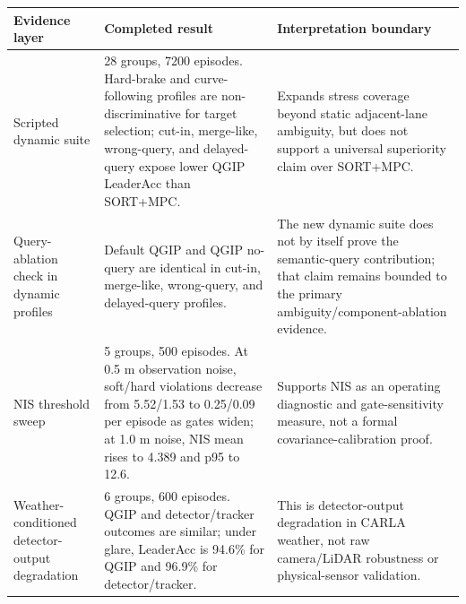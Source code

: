 \begin{tabular}{p{} p{} p{}}
\toprule
\textbf{Evidence layer} & \textbf{Completed result} & \textbf{Interpretation boundary} \\
\midrule
Scripted dynamic suite & 28 groups, 7200 episodes. Hard-brake and curve-following profiles are non-discriminative for target selection; cut-in, merge-like, wrong-query, and delayed-query expose lower QGIP LeaderAcc than SORT+MPC. & Expands stress coverage beyond static adjacent-lane ambiguity, but does not support a universal superiority claim over SORT+MPC. \\
Query-ablation check in dynamic profiles & Default QGIP and QGIP no-query are identical in cut-in, merge-like, wrong-query, and delayed-query profiles. & The new dynamic suite does not by itself prove the semantic-query contribution; that claim remains bounded to the primary ambiguity/component-ablation evidence. \\
NIS threshold sweep & 5 groups, 500 episodes. At 0.5 m observation noise, soft/hard violations decrease from 5.52/1.53 to 0.25/0.09 per episode as gates widen; at 1.0 m noise, NIS mean rises to 4.389 and p95 to 12.6. & Supports NIS as an operating diagnostic and gate-sensitivity measure, not a formal covariance-calibration proof. \\
Weather-conditioned detector-output degradation & 6 groups, 600 episodes. QGIP and detector/tracker outcomes are similar; under glare, LeaderAcc is 94.6\% for QGIP and 96.9\% for detector/tracker. & This is detector-output degradation in CARLA weather, not raw camera/LiDAR robustness or physical-sensor validation. \\
\bottomrule
\end{tabular}
